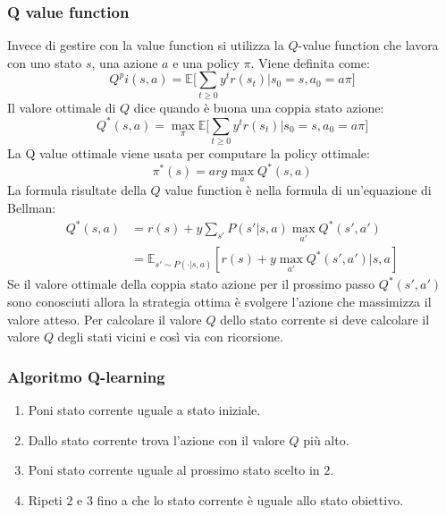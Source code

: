 		\subsubsection{Q value function}
		Invece di gestire con la value function si utilizza la $Q$-value function che lavora con uno stato $s$, una azione $a$ e una policy $\pi$.
		Viene definita come:
		$$Q^pi(s,a) = \mathbb{E}\biggl[\sum\limits_{t\ge 0} y^tr(s_t)|s_0 = s,a_0 = a\pi\biggr]$$
		Il valore ottimale di $Q$ dice quando \`e buona una coppia stato azione:
		$$Q^*(s,a) =\max_\pi\mathbb{E}\biggl[\sum\limits_{t\ge 0} y^tr(s_t)|s_0 = s,a_0 = a\pi\biggr]$$
		La Q value ottimale viene usata per computare la policy ottimale:
		$$\pi^*(s) = arg\max_aQ^*(s,a)$$
		La formula risultate della $Q$ value function \`e nella formula di un'equazione di Bellman:
		\begin{align*}
			Q^*(s,a) &= r(s) + y\sum\limits_{s'}P(s'|s,a)\max_{a'}Q^*(s',a')\\
							 &=\mathbb{E}_{s'\sim P(\cdot|s,a)}[r(s)+y\max_{a'}Q^*(s',a')|s,a]
		\end{align*}
		Se il valore ottimale della coppia stato azione per il prossimo passo $Q^*(s',a')$ sono conosciuti allora la strategia ottima \`e svolgere l'azione che massimizza il valore atteso.
		Per calcolare il valore $Q$ dello stato corrente si deve calcolare il valore $Q$ degli stati vicini e cos\`i via con ricorsione.

		\subsubsection{Algoritmo Q-learning}
		\begin{enumerate}
			\item Poni stato corrente uguale a stato iniziale.
			\item Dallo stato corrente trova l'azione con il valore $Q$ pi\`u alto.
			\item Poni stato corrente uguale al prossimo stato scelto in $2$.
			\item Ripeti $2$ e $3$ fino a che lo stato corrente \`e uguale allo stato obiettivo.
		\end{enumerate}


